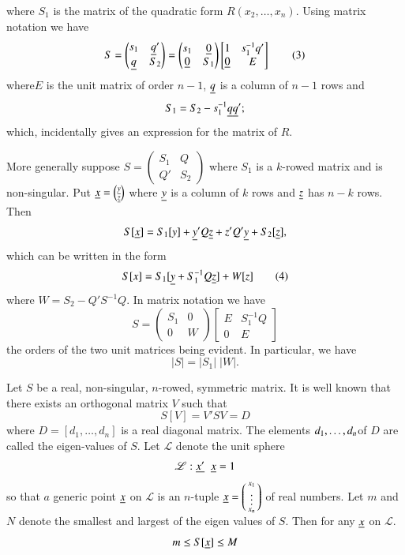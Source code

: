 where $S_{1}$ is the matrix of the quadratic form
$R(x_{2},\ldots,x_{n})$. Using matrix notation we have
\begin{equation*}
S=
\begin{pmatrix}
s_{1} & \underline{q}'\\
\underline{q} & S_{2}
\end{pmatrix}
=
\begin{pmatrix}
s_{1} & \underline{0}\\
\underline{0} & S_{1}
\end{pmatrix}
\begin{bmatrix}
1 & s^{-1}_{1}q'\\
\underline{0} & E
\end{bmatrix}
\tag{3}\label{c2:eq3}
\end{equation*}
where\pageoriginale $E$ is the unit matrix of order $n-1$, $\underline{q}$ is
a column of $n-1$ rows and
$$
S_{1}=S_{2}-s^{-1}_{1}\underline{q}\underline{q}';
$$
which, incidentally gives an expression for the matrix of $R$.

More generally suppose $S=\left(\begin{smallmatrix} S_{1} & Q\\ Q' &
  S_{2}\end{smallmatrix}\right)$ where $S_{1}$ is a $k$-rowed matrix
and is non-singular. Put $\underline{x}=\binom{\underline{y}}{\underline{z}}$ where
$\underline{y}$ is a column of $k$ rows and $\underline{z}$ has $n-k$ rows. Then
$$
S[\underline{x}]=S_{1}[y]+\underline{y}'Q\underline{z}+z'Q'\underline{y}+S_{2}[\underline{z}],
$$
which can be written in the form
\begin{equation*}
S[x]=S_{1}[\underline{y}+S^{-1}_{1}Q\underline{z}]+W[z]\tag{4}\label{c2:eq4}
\end{equation*}
where $W=S_{2}-Q'S^{-1}Q$. In matrix notation we have
\begin{equation*}
S=
\begin{pmatrix}
S_{1} & 0\\
0 & W
\end{pmatrix}
\begin{bmatrix}
E & S^{-1}_{1}Q\\
0 & E
\end{bmatrix}\tag{5}\label{c2:eq5}
\end{equation*}
the orders of the two unit matrices being evident. In particular, we
have
$$
|S|=|S_{1}|\;|W|.
$$

Let $S$ be a real, non-singular, $n$-rowed, symmetric matrix. It is
well known that there exists an orthogonal matrix $V$ such that 
$$
S[V]=V'SV=D
$$
where $D=[d_{1},\ldots,d_{n}]$ is a real diagonal matrix. The elements
$d_{1},\ldots,\break d_{n}$\pageoriginale of $D$ are called the eigen-values
of $S$. Let $\mathscr{L}$ denote the unit sphere
$$
\mathscr{L}:\underline{x'} \;\; \underline{x}=1 
$$
so that $a$ generic point $\underline{x}$ on $\mathscr{L}$ is an $n$-tuple
$\underline{x}=
\left(\begin{smallmatrix}x_{1}\\ \vdots\\ x_{n}\end{smallmatrix}
\right)$ of 
real numbers. Let $m$ and $N$ denote the smallest and largest of the
eigen values of $S$. Then for any $\underline{x}$ on $\mathscr{L}$.
$$
m\leq S[\underline{x}]\leq M
$$

